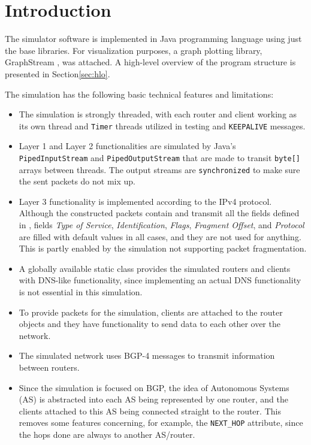 \documentclass[11pt,a4paper,titlepage]{report}
\begin{document}
\section{Introduction}\label{sec:intro}
The simulator software is implemented in Java programming language using just the base libraries. For visualization purposes, a graph plotting library, GraphStream \cite{graphstreamteam2017}, was attached. A high-level overview of the program structure is presented in Section\ref{sec:hlo}.

The simulation has the following basic technical features and limitations:
\begin{itemize}
\item The simulation is strongly threaded, with each router and client working as its own thread and \texttt{Timer} threads utilized in testing and \texttt{KEEPALIVE} messages.
\item Layer 1 and Layer 2 functionalities are simulated by Java's \texttt{PipedInputStream} and \texttt{PipedOutputStream} that are made to transit \texttt{byte[]} arrays between threads. The output streams are \texttt{synchronized} to make sure the sent packets do not mix up.
\item Layer 3 functionality is implemented according to the IPv4 protocol. Although the constructed packets contain and transmit all the fields defined in \cite{RFC0791}, fields \emph{Type of Service}, \emph{Identification}, \emph{Flags}, \emph{Fragment Offset}, and \emph{Protocol} are filled with default values in all cases, and they are not used for anything. This is partly enabled by the simulation not supporting packet fragmentation.
\item A globally available static class provides the simulated routers and clients with DNS-like functionality, since implementing an actual DNS functionality is not essential in this simulation.
\item To provide packets for the simulation, clients are attached to the router objects and they have functionality to send data to each other over the network.
\item The simulated network uses BGP-4 messages to transmit information between routers.
\item Since the simulation is focused on BGP, the idea of Autonomous Systems (AS) is abstracted into each AS being represented by one router, and the clients attached to this AS being connected straight to the router. This removes some features concerning, for example, the \texttt{NEXT\_HOP} attribute, since the hops done are always to another AS/router.

\end{itemize}
\end{document}
